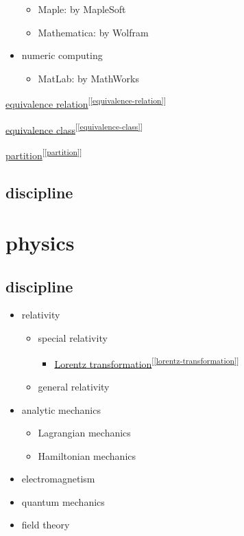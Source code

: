 \documentclass[
]{book}
\providecommand{\tightlist}{%
  \setlength{\itemsep}{0pt}\setlength{\parskip}{0pt}}
\theoremstyle{definition}
\theoremstyle{definition}
\theoremstyle{definition}
\theoremstyle{definition}
\theoremstyle{remark}
\begin{document}
\begin{itemize}
  \begin{itemize}
  \tightlist
  \item
    Maple: by MapleSoft
  \item
    Mathematica: by Wolfram
  \end{itemize}
\item
  numeric computing

  \begin{itemize}
  \tightlist
  \item
    MatLab: by MathWorks
  \end{itemize}
\end{itemize}

\hyperref[equivalence-relation]{equivalence relation}\textsuperscript{{[}\ref{equivalence-relation}{]}}

\hyperref[equivalence-class]{equivalence class}\textsuperscript{{[}\ref{equivalence-class}{]}}

\hyperref[partition]{partition}\textsuperscript{{[}\ref{partition}{]}}

\section{discipline}\label{discipline}

\chapter{physics}\label{physics}

\section{discipline}\label{discipline-1}

\begin{itemize}
\tightlist
\item
  relativity

  \begin{itemize}
  \tightlist
  \item
    special relativity

    \begin{itemize}
    \tightlist
    \item
      \hyperref[lorentz-transformation]{Lorentz transformation}\textsuperscript{{[}\ref{lorentz-transformation}{]}}
    \end{itemize}
  \item
    general relativity
  \end{itemize}
\item
  analytic mechanics

  \begin{itemize}
  \tightlist
  \item
    Lagrangian mechanics
  \item
    Hamiltonian mechanics
  \end{itemize}
\item
  electromagnetism
\item
  quantum mechanics
\item
  field theory
\end{itemize}
\end{document}

